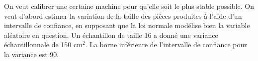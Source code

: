 \begin{questions}
\question On veut calibrer une certaine machine pour qu'elle soit le plus stable possible.
On veut d’abord estimer la variation de la taille des pièces produites à l'aide d'un intervalle de confiance, en supposant que la loi normale modélise bien la variable aléatoire en question.
Un échantillon de taille 16 a donné une variance échantillonnale de 150 cm$^2$.
La borne inférieure de l'intervalle de confiance pour la variance est $90$.

\vspace{0.5cm}




\end{questions}

 
